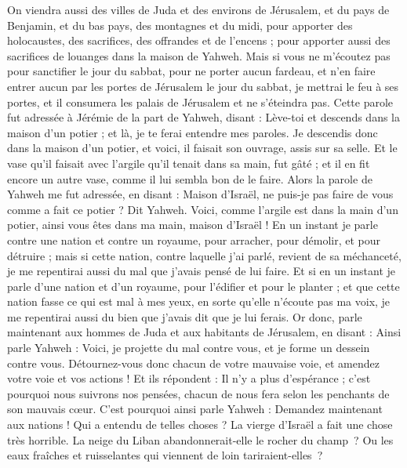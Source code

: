 \begin{multicols}{2}
On viendra aussi des villes de Juda et des environs de Jérusalem, et du pays de Benjamin, et du bas pays, des montagnes et du midi, pour apporter des holocaustes, des sacrifices, des offrandes et de l'encens ; pour apporter aussi des sacrifices de louanges dans la maison de Yahweh.
Mais si vous ne m'écoutez pas pour sanctifier le jour du sabbat, pour ne porter aucun fardeau, et n'en faire entrer aucun par les portes de Jérusalem le jour du sabbat, je mettrai le feu à ses portes, et il consumera les palais de Jérusalem et ne s'éteindra pas.
\VerseOne{}Cette parole fut adressée à Jérémie de la part de Yahweh, disant :
Lève-toi et descends dans la maison d'un potier ; et là, je te ferai entendre mes paroles.
Je descendis donc dans la maison d'un potier, et voici, il faisait son ouvrage, assis sur sa selle.
Et le vase qu'il faisait avec l'argile qu'il tenait dans sa main, fut gâté ; et il en fit encore un autre vase, comme il lui sembla bon de le faire.
Alors la parole de Yahweh me fut adressée, en disant :
Maison d'Israël, ne puis-je pas faire de vous comme a fait ce potier ? Dit Yahweh. Voici, comme l'argile est dans la main d'un potier, ainsi vous êtes dans ma main, maison d'Israël !
En un instant je parle contre une nation et contre un royaume, pour arracher, pour démolir, et pour détruire ;
mais si cette nation, contre laquelle j'ai parlé, revient de sa méchanceté, je me repentirai aussi du mal que j'avais pensé de lui faire.
Et si en un instant je parle d'une nation et d'un royaume, pour l'édifier et pour le planter ;
 et que cette nation fasse ce qui est mal à mes yeux, en sorte qu'elle n'écoute pas ma voix, je me repentirai aussi du bien que j'avais dit que je lui ferais.
Or donc, parle maintenant aux hommes de Juda et aux habitants de Jérusalem, en disant : Ainsi parle Yahweh : Voici, je projette du mal contre vous, et je forme un dessein contre vous. Détournez-vous donc chacun de votre mauvaise voie, et amendez votre voie et vos actions !
Et ils répondent : Il n'y a plus d'espérance ; c'est pourquoi nous suivrons nos pensées, chacun de nous fera selon les penchants de son mauvais cœur.
C'est pourquoi ainsi parle Yahweh : Demandez maintenant aux nations ! Qui a entendu de telles choses ? La vierge d'Israël a fait une chose très horrible.
La neige du Liban abandonnerait-elle le rocher du champ ? Ou les eaux fraîches et ruisselantes qui viennent de loin tariraient-elles ?

\end{multicols}
